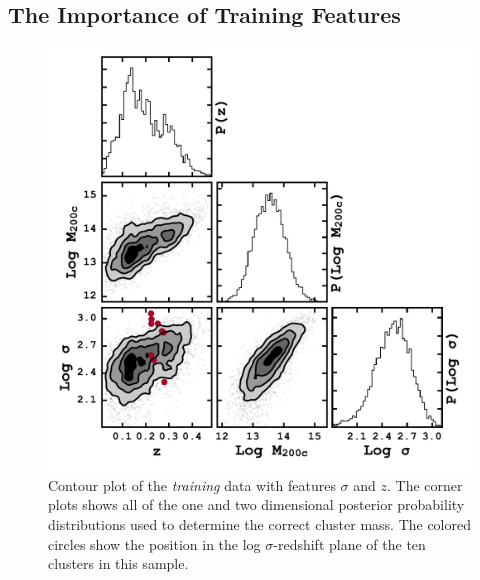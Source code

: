 \subsection{The Importance of Training Features}\label{2sec: training features}
\begin{figure}[!ht]
	\begin{center}
		\includegraphics[width=\textwidth]{figures2/buzzardCorner.pdf}
	\end{center}
	\caption[Corner plot of the \emph{training} data with features $\sigma$ and $z$.]{Contour plot of the \emph{training} data with features $\sigma$ and $z$. The corner plots shows all of the one and two dimensional posterior probability distributions used to determine the correct cluster mass. The colored circles show the position in the log $\sigma$-redshift plane of the ten clusters in this sample.}
	\label{2fig:buzzardCorner}
\end{figure}

